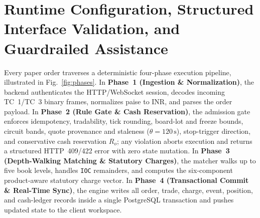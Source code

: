 \documentclass[journal,onecolumn,10pt]{IEEEtran}
\newcommand{\thinunit}[2]{#1\,\text{#2}}
\begin{document}
\section{Runtime Configuration, Structured Interface Validation, and Guardrailed Assistance}

Every paper order traverses a deterministic four-phase execution pipeline, illustrated in Fig.~\ref{fig:phases}. In \textbf{Phase~1 (Ingestion \& Normalization)}, the backend authenticates the HTTP/WebSocket session, decodes incoming TC~1/TC~3 binary frames, normalizes paise to INR, and parses the order payload. In \textbf{Phase~2 (Rule Gate \& Cash Reservation)}, the admission gate enforces idempotency, tradability, tick rounding, board-lot and freeze bounds, circuit bands, quote provenance and staleness ($\theta=\thinunit{120}{s}$), stop-trigger direction, and conservative cash reservation $R_o$; any violation aborts execution and returns a structured HTTP~409/422 error with zero state mutation. In \textbf{Phase~3 (Depth-Walking Matching \& Statutory Charges)}, the matcher walks up to five book levels, handles \texttt{IOC} remainders, and computes the six-component product-aware statutory charge vector. In \textbf{Phase~4 (Transactional Commit \& Real-Time Sync)}, the engine writes all order, trade, charge, event, position, and cash-ledger records inside a single PostgreSQL transaction and pushes updated state to the client workspace.
\end{document}
